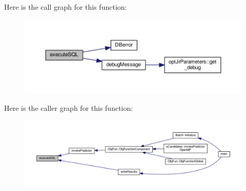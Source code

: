 Here is the call graph for this function\-:\nopagebreak
\begin{figure}[H]
\begin{center}
\leavevmode
\includegraphics[width=350pt]{db_8hh_a2491baf1bdfde4dc81303042399a6278_cgraph}
\end{center}
\end{figure}




Here is the caller graph for this function\-:
\nopagebreak
\begin{figure}[H]
\begin{center}
\leavevmode
\includegraphics[width=350pt]{db_8hh_a2491baf1bdfde4dc81303042399a6278_icgraph}
\end{center}
\end{figure}



